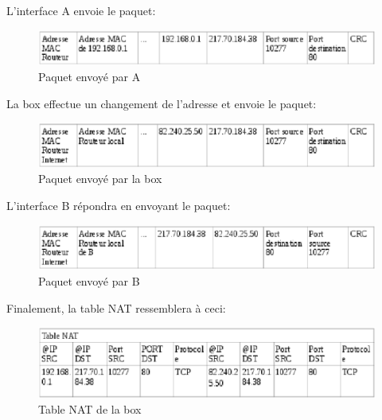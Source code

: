 L'interface A envoie le paquet:
\begin{figure}[h]
\centering
\includegraphics[width=12cm]{./pics/PaquetAR.eps}
\caption{Paquet envoyé par A}
\label{fig:paquetAR}
\end{figure}

La box effectue un changement de l'adresse et envoie le paquet:
\begin{figure}[h]
\centering
\includegraphics[width=12cm]{./pics/PaquetRB.eps}
\caption{Paquet envoyé par la box}
\label{fig:paquetRB}
\end{figure}

\newpage

L'interface B répondra en envoyant le paquet:
\begin{figure}[h]
\centering
\includegraphics[width=12cm]{./pics/PaquetBR.eps}
\caption{Paquet envoyé par B}
\label{fig:paquetBR}
\end{figure}
\smallbreak
Finalement, la table NAT ressemblera à ceci:

\begin{figure}[h]
\centering
\includegraphics[width=12cm]{./pics/TableNAT1.eps}
\caption{Table NAT de la box}
\label{fig:NAT1}
\end{figure}

